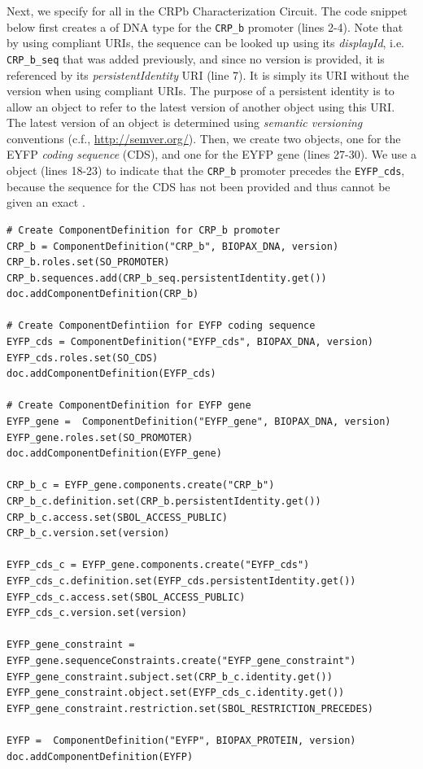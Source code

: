 Next, we specify  for all  in the CRPb Characterization Circuit. The code snippet below first creates a  of DNA type for the \lstinline+CRP_b+ promoter (lines 2-4). Note that by using compliant URIs, the sequence can be looked up using its \emph{displayId}, i.e. \lstinline+CRP_b_seq+ that was added previously, and since no version is provided, it is referenced by its \emph{persistentIdentity} URI (line 7). It is simply its URI without the version when using compliant URIs. The purpose of a persistent identity is to allow an object to refer to the latest version of another object using this URI. The latest version of an object is determined using \emph{semantic versioning} conventions (c.f., \url{http://semver.org/}). Then, we create two  objects, one for the EYFP \emph{coding sequence} (CDS), and one for the EYFP gene (lines 27-30). We use a  object (lines 18-23) to indicate that the \lstinline+CRP_b+ promoter precedes the \lstinline+EYFP_cds+, because the sequence for the CDS has not been provided and thus cannot be given an exact . 

\vspace{\abovedisplayskip}
\begin{minipage}{0.95\textwidth}
\begin{lstlisting}
# Create ComponentDefinition for CRP_b promoter
CRP_b = ComponentDefinition("CRP_b", BIOPAX_DNA, version)
CRP_b.roles.set(SO_PROMOTER)
CRP_b.sequences.add(CRP_b_seq.persistentIdentity.get())
doc.addComponentDefinition(CRP_b)

# Create ComponentDefintiion for EYFP coding sequence
EYFP_cds = ComponentDefinition("EYFP_cds", BIOPAX_DNA, version)
EYFP_cds.roles.set(SO_CDS)
doc.addComponentDefinition(EYFP_cds)

# Create ComponentDefinition for EYFP gene
EYFP_gene =  ComponentDefinition("EYFP_gene", BIOPAX_DNA, version)
EYFP_gene.roles.set(SO_PROMOTER)
doc.addComponentDefinition(EYFP_gene)

CRP_b_c = EYFP_gene.components.create("CRP_b")
CRP_b_c.definition.set(CRP_b.persistentIdentity.get())
CRP_b_c.access.set(SBOL_ACCESS_PUBLIC)
CRP_b_c.version.set(version)

EYFP_cds_c = EYFP_gene.components.create("EYFP_cds")
EYFP_cds_c.definition.set(EYFP_cds.persistentIdentity.get())
EYFP_cds_c.access.set(SBOL_ACCESS_PUBLIC)
EYFP_cds_c.version.set(version)

EYFP_gene_constraint = EYFP_gene.sequenceConstraints.create("EYFP_gene_constraint")
EYFP_gene_constraint.subject.set(CRP_b_c.identity.get())
EYFP_gene_constraint.object.set(EYFP_cds_c.identity.get())
EYFP_gene_constraint.restriction.set(SBOL_RESTRICTION_PRECEDES)

EYFP =  ComponentDefinition("EYFP", BIOPAX_PROTEIN, version)
doc.addComponentDefinition(EYFP)
\end{lstlisting}
\end{minipage}

